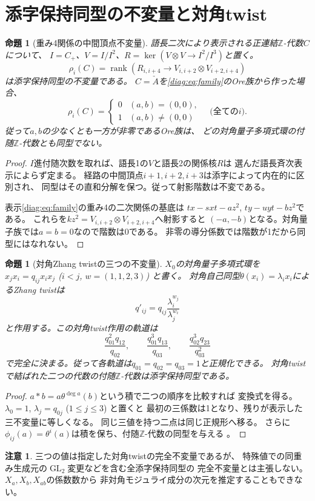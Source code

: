 \documentclass[11pt,a4paper]{ltjsarticle}
\newtheorem{proposition}[theorem]{命題}
\theoremstyle{definition}
\newcommand{\GL}{\operatorname{GL}}
\newtheorem{remark}[theorem]{注意}
\newcommand{\rk}{\operatorname{rank}}
\newcommand{\ZZ}{\mathbb Z}
\begin{document}
\section{添字保持同型の不変量と対角twist}
\begin{proposition}[重み4関係の中間頂点不変量]\label{diag:prop:rho}
語長二次により表示される正連結$\ZZ$-代数$C$について、
$I=C_+$、$V=I/I^2$、$R=\ker(V\otimes V\to I^2/I^3)$と置く。
\[
\rho_i(C)=\rk\left(R_{i,i+4}\longrightarrow
V_{i,i+2}\otimes V_{i+2,i+4}\right)
\]
は添字保持同型の不変量である。
$C=\check A$を\eqref{diag:eq:family}のOre族から作った場合、
\[
\rho_i(C)=\begin{cases}0&(a,b)=(0,0),\\1&(a,b)\ne(0,0)
\end{cases}
\quad\text{(全ての$i$)}.
\]
従って$a,b$の少なくとも一方が非零であるOre族は、
どの対角量子多項式環の付随$\ZZ$-代数とも同型でない。
\end{proposition}
\begin{proof}
$I$進付随次数を取れば、語長1の$V$と語長2の関係核$R$は
選んだ語長斉次表示によらず定まる。
経路の中間頂点$i+1,i+2,i+3$は添字によって内在的に区別され、
同型はその直和分解を保つ。従って射影階数は不変である。

表示\eqref{diag:eq:family}の重み4の二次関係の基底は
$tx-sxt-az^2$, $ty-uyt-bz^2$である。
これらを$kz^2=V_{i,i+2}\otimes V_{i+2,i+4}$へ射影すると
$(-a,-b)$となる。対角量子族では$a=b=0$なので階数は0である。
非零の導分係数では階数が1だから同型にはなれない。
\end{proof}

\begin{proposition}[対角Zhang twistの三つの不変量]\label{diag:prop:twist}
$X_0$の対角量子多項式環を
$x_jx_i=q_{ij}x_ix_j$ ($i<j$, $w=(1,1,2,3)$) と書く。
対角自己同型$\theta(x_i)=\lambda_i x_i$によるZhang twistは
\[q'_{ij}=q_{ij}\frac{\lambda_i^{w_j}}{\lambda_j^{w_i}}\]
と作用する。この\emph{対角twist作用}の軌道は
\[
\frac{q_{01}^2q_{12}}{q_{02}},\qquad
\frac{q_{01}^3q_{13}}{q_{03}},\qquad
\frac{q_{02}^3q_{23}}{q_{03}^2}
\]
で完全に決まる。従って各軌道は$q_{01}=q_{02}=q_{03}=1$と正規化できる。
対角twistで結ばれた二つの代数の付随$\ZZ$-代数は添字保持同型である。
\end{proposition}
\begin{proof}
$a*b=a\theta^{\deg a}(b)$という積で二つの順序を比較すれば
変換式を得る。$\lambda_0=1$, $\lambda_j=q_{0j}$ ($1\leq j\leq3$) と置くと
最初の三係数は1となり、残りが表示した三不変量に等しくなる。
同じ三値を持つ二点は同じ正規形へ移る。
さらに$\phi_{ij}(a)=\theta^i(a)$は積を保ち、付随$\ZZ$-代数の同型を与える
\cite{Sierra}。
\end{proof}
\begin{remark}
三つの値は指定した対角twistの完全不変量であるが、
特殊値での同重み生成元の$\GL_2$変更などを含む全添字保持同型の
完全不変量とは主張しない。$X_a,X_b,X_{ab}$の係数数から
非対角モジュライ成分の次元を推定することもできない。
\end{remark}
\end{document}
